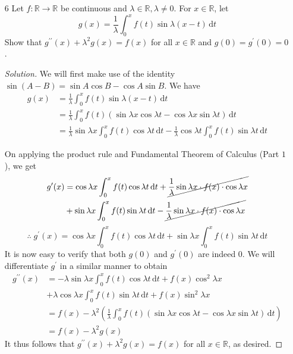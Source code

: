 \documentclass[12pt]{article}
\def\D{\mathrm{d}}
\theoremstyle{definition}
\newenvironment{soln}{\begin{proof}[Solution]}{\end{proof}}
\begin{document}
\begin{enumerate}[leftmargin=*]
    \newpage
    
    \item[6] Let $f \colon \mathbb{R} \to \mathbb{R}$ be continuous and $\lambda \in \mathbb{R}, \lambda \neq 0$. For $x \in \mathbb{R}$, let
    \[
        g(x) = \frac{1}{\lambda} \int_0^x f(t) \sin{\lambda(x-t)} \, \D t
    \]
    Show that $g^{\prime\prime}(x) + \lambda^2 g(x) = f(x)$ for all $x \in \mathbb{R}$ and $g(0) = g^{\prime}(0) = 0$.
    
    \begin{soln}
        We will first make use of the identity $\sin{(A-B)} = \sin{A}\cos{B} - \cos{A}\sin{B}$. We have
        \begin{align*}
            g(x) &= \frac{1}{\lambda} \int_0^x f(t) \sin{\lambda(x-t)} \, \D t \\
            &= \frac{1}{\lambda} \int_0^x f(t) \left( \sin{\lambda x} \cos{\lambda t} - \cos{\lambda x} \sin{\lambda t} \right) \, \D t \\
            &= \frac{1}{\lambda} \sin{\lambda x} \int_0^x f(t) \cos{\lambda t} \, \D t - \frac{1}{\lambda} \cos{\lambda t} \int_0^x f(t) \sin{\lambda t} \, \D t
        \end{align*}
        
        On applying the product rule and Fundamental Theorem of Calculus (Part $1$), we get
        \begin{align*}
            g^{\prime}(x) &= \cos{\lambda x} \int_0^x f(t) \cos{\lambda t} \, \D t + \cancel{\frac{1}{\lambda} \sin{\lambda x} \cdot f(x) \cdot \cos{\lambda x}} \\
            &+ \sin{\lambda x} \int_0^x f(t) \sin{\lambda t} \, \D t - \cancel{ \frac{1}{\lambda} \sin{\lambda x} \cdot f(x) \cdot \cos{\lambda x}}
        \end{align*}
        \[
            \therefore \; g^{\prime}(x) = \cos{\lambda x} \int_0^x f(t) \cos{\lambda t} \, \D t + \sin{\lambda x} \int_0^x f(t) \sin{\lambda t} \, \D t
        \]
        It is now easy to verify that both $g(0)$ and $g^{\prime}(0)$ are indeed $0$. We will differentiate $g^{\prime}$ in a similar manner to obtain
        \begin{align*}
            g^{\prime \prime}(x) &= -\lambda \sin{\lambda x} \int_0^x f(t) \cos{\lambda t} \, \D t + f(x) \cos^2{\lambda x} \\
            &+ \lambda \cos{\lambda x} \int_0^x f(t) \sin{\lambda t} \, \D t + f(x) \sin^2{\lambda x} \\
            &= f(x) - \lambda^2 \left( \frac{1}{\lambda} \int_0^x f(t) \left( \sin{\lambda x} \cos{\lambda t} - \cos{\lambda x} \sin{\lambda t} \right) \, \D t\right) \\
            &= f(x) - \lambda^2 g(x)
        \end{align*}
        It thus follows that $g^{\prime\prime}(x) + \lambda^2 g(x) = f(x)$ for all $x \in \mathbb{R}$, as desired.
    \end{soln}
\end{enumerate}
\end{document}
